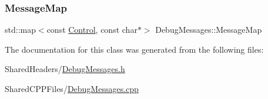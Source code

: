 \subsubsection{\texorpdfstring{Message\+Map}{MessageMap}}
{\footnotesize\ttfamily std\+::map$<$const \mbox{\hyperlink{_debug_messages_8h_a0da83e35f29c11f7f3c637234f2149f9}{Control}}, const char$\ast$$>$ Debug\+Messages\+::\+Message\+Map\hspace{0.3cm}{\ttfamily [private]}}



The documentation for this class was generated from the following files\+:\begin{DoxyCompactItemize}
\item 
Shared\+Headers/\mbox{\hyperlink{_debug_messages_8h}{Debug\+Messages.\+h}}\item 
Shared\+C\+P\+P\+Files/\mbox{\hyperlink{_debug_messages_8cpp}{Debug\+Messages.\+cpp}}\end{DoxyCompactItemize}
